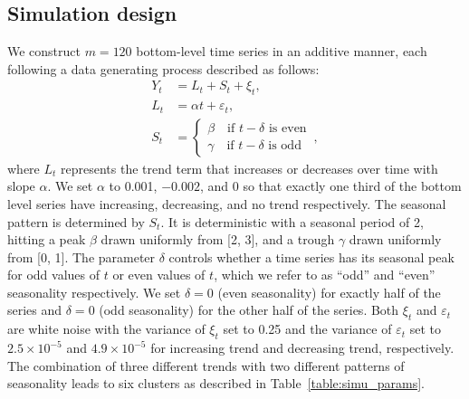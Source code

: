 \documentclass[a4paper,review,12pt,authoryear]{elsarticle}
\begin{document}


\subsection{Simulation design}


We construct $m=120$ bottom-level time series in an additive manner, each following a data generating process described as follows:
\begin{equation}
    \label{simu:DGP}
    \begin{aligned}
    Y_t &= L_t + S_t + \xi_t, \\
        L_t &= \alpha t + \varepsilon_t,\\
    S_t &= \begin{cases}\beta\quad\textrm{if $t-\delta$ is even}\\\gamma\quad\textrm{if $t-\delta$ is odd}\end{cases}\,,
    \end{aligned}
\end{equation}
where $L_t$ represents the trend term that increases or decreases over time with slope $\alpha$. We set $\alpha$ to 0.001, $-0.002$, and 0 so that exactly one third of the bottom level series have increasing, decreasing, and no trend respectively. The seasonal pattern is determined by $S_t$. It is deterministic with a seasonal period of 2, hitting a peak $\beta$ drawn uniformly from [2, 3], and a trough $\gamma$ drawn uniformly from [0, 1]. The parameter $\delta$ controls whether a time series has its seasonal peak for odd values of $t$ or even values of $t$, which we refer to as ``odd'' and ``even'' seasonality respectively. We set $\delta=0$ (even seasonality) for exactly half of the series and $\delta=0$ (odd seasonality) for the other half of the series. Both $\xi_t$ and $\varepsilon_t$ are white noise with the variance of $\xi_t$ set to 0.25 and the variance of $\varepsilon_t$ set to $2.5\times 10^{-5}$ and $4.9\times 10^{-5}$ for increasing trend and decreasing trend, respectively. The combination of three different trends with two different patterns of seasonality leads to six clusters as described in Table~\ref{table:simu_params}.%
\end{document}
